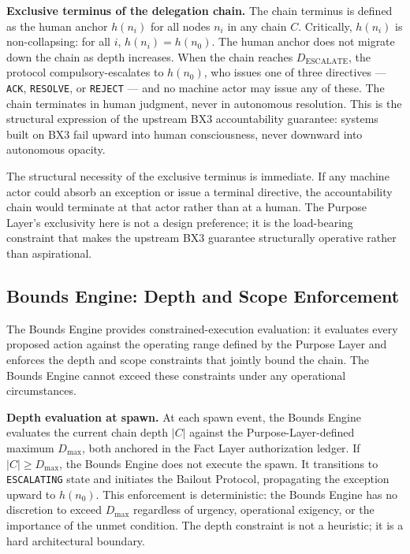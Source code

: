 \medskip
\noindent\textbf{Exclusive terminus of the delegation chain.} The chain terminus is defined as the human anchor $h(n_i)$ for all nodes $n_i$ in any chain $C$. Critically, $h(n_i)$ is non-collapsing: for all $i$, $h(n_i) = h(n_0)$. The human anchor does not migrate down the chain as depth increases. When the chain reaches $D_{\mathrm{ESCALATE}}$, the protocol compulsory-escalates to $h(n_0)$, who issues one of three directives --- \texttt{ACK}, \texttt{RESOLVE}, or \texttt{REJECT} --- and no machine actor may issue any of these. The chain terminates in human judgment, never in autonomous resolution. This is the structural expression of the upstream BX3 accountability guarantee: systems built on BX3 fail upward into human consciousness, never downward into autonomous opacity.

The structural necessity of the exclusive terminus is immediate. If any machine actor could absorb an exception or issue a terminal directive, the accountability chain would terminate at that actor rather than at a human. The Purpose Layer's exclusivity here is not a design preference; it is the load-bearing constraint that makes the upstream BX3 guarantee structurally operative rather than aspirational.

\subsection{Bounds Engine: Depth and Scope Enforcement}
\label{sec:rs-bounds-depth}

The Bounds Engine provides constrained-execution evaluation: it evaluates every proposed action against the operating range defined by the Purpose Layer and enforces the depth and scope constraints that jointly bound the chain. The Bounds Engine cannot exceed these constraints under any operational circumstances.

\medskip
\noindent\textbf{Depth evaluation at spawn.} At each spawn event, the Bounds Engine evaluates the current chain depth $|C|$ against the Purpose-Layer-defined maximum $D_{\mathrm{max}}$, both anchored in the Fact Layer authorization ledger. If $|C| \geq D_{\mathrm{max}}$, the Bounds Engine does not execute the spawn. It transitions to \texttt{ESCALATING} state and initiates the Bailout Protocol, propagating the exception upward to $h(n_0)$. This enforcement is deterministic: the Bounds Engine has no discretion to exceed $D_{\mathrm{max}}$ regardless of urgency, operational exigency, or the importance of the unmet condition. The depth constraint is not a heuristic; it is a hard architectural boundary.

